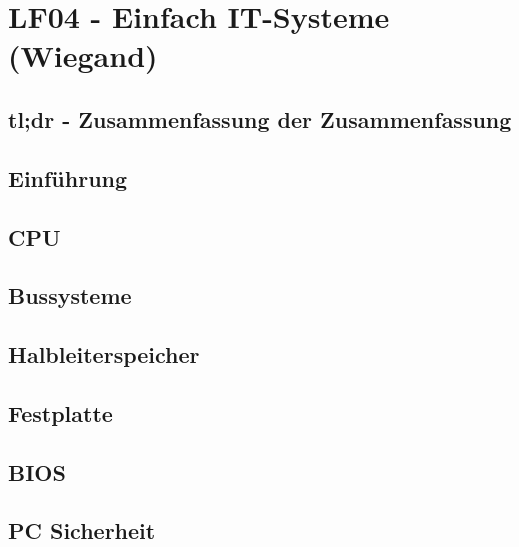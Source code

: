 \section{LF04 - Einfach IT-Systeme (Wiegand)}
%

\subsection{tl;dr - Zusammenfassung der Zusammenfassung}

\subsection{Einführung}

\subsection{CPU}

\subsection{Bussysteme}

\subsection{Halbleiterspeicher}

\subsection{Festplatte}

\subsection{BIOS}

\subsection{PC Sicherheit}

